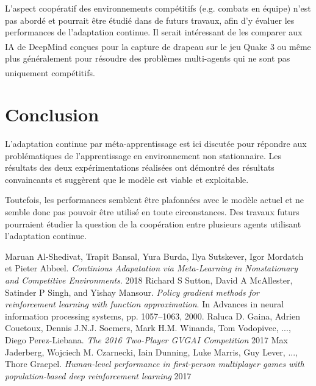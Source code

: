 \documentclass[a4paper,11pt]{article}
\begin{document}
    L'aspect coopératif des environnements compétitifs (e.g. combats en équipe) n'est pas abordé et 
    pourrait être étudié dans de futurs travaux, afin d'y évaluer les performances de l'adaptation 
    continue. Il serait intéressant de les comparer aux IA de DeepMind conçues pour la capture de drapeau sur 
    le jeu Quake 3\textsuperscript{\cite{jaderberg}} ou même plus généralement pour résoudre des problèmes multi-agents qui ne 
    sont pas uniquement compétitifs\textsuperscript{\cite{raluca}}.

    \section{Conclusion}

    L'adaptation continue par méta-apprentissage est ici discutée pour répondre aux problématiques de l'apprentissage
    en environnement non stationnaire. Les résultats des deux expérimentations réalisées ont démontré
    des résultats convaincants et suggèrent que le modèle est viable et exploitable.

    Toutefois, les performances semblent être plafonnées avec le modèle actuel et ne semble donc pas 
    pouvoir être utilisé en toute circonstances. Des travaux futurs pourraient étudier la question de 
    la coopération entre plusieurs agents utilisant l'adaptation continue.

    \begin{thebibliography}{9}
        Maruan Al-Shedivat, Trapit Bansal, Yura Burda, Ilya Sutskever, Igor Mordatch et Pieter Abbeel.
        \emph{Continious Adapatation via Meta-Learning in Nonstationary and Competitive Environments}.
        2018
        Richard S Sutton, David A McAllester, Satinder P Singh, and Yishay Mansour.
        \emph{Policy gradient methods for reinforcement learning with function approximation}.
        In Advances in neural information processing systems, pp. 1057–1063, 2000.
        Raluca D. Gaina, Adrien Couetoux, Dennis J.N.J. Soemers, Mark H.M. Winands, Tom Vodopivec, ..., Diego Perez-Liebana.
        \emph{The 2016 Two-Player GVGAI Competition}
        2017
         Max Jaderberg, Wojciech M. Czarnecki, Iain Dunning, Luke Marris, Guy Lever, ..., Thore Graepel.
        \emph{Human-level performance in first-person multiplayer games with population-based deep reinforcement learning}
        2017
    \end{thebibliography}
 
  
\end{document}

